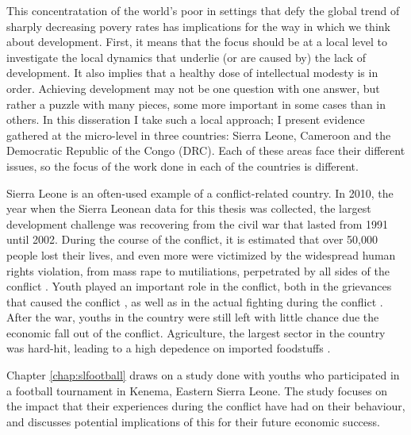 This concentratation of the world's poor in settings that defy the global trend of sharply decreasing povery rates has implications for the way in which we think about development. First, it means that the focus should be at a local level to investigate the local dynamics that underlie (or are caused by) the lack of development. It also implies that a healthy dose of intellectual modesty is in order. Achieving development may not be one question with one answer, but rather a puzzle with many pieces, some more important in some cases than in others. In this disseration I take such a local approach; I  present evidence gathered at the micro-level in three countries: Sierra Leone, Cameroon and the Democratic Republic of the Congo (DRC). Each of these areas face their different issues, so the focus of the work done in each of the countries is different.

Sierra Leone is an often-used example of a conflict-related country. In 2010, the year when the Sierra Leonean data for this thesis was collected, the largest development challenge was recovering from the civil war that lasted from 1991 until 2002. During the course of the conflict, it is estimated that over 50,000 people lost their lives, and even more were victimized by the widespread human rights violation, from mass rape to mutiliations, perpetrated by all sides of the conflict \citep{HumanRightsWatch1999a}. Youth played an important role in the conflict, both in the grievances that caused the conflict \citep[see e.g.][]{Peters1998,Richards2005,Peters2011}, as well as in the actual fighting during the conflict \citep{Humphreys2013}. After the war, youths in the country were still left with little chance due the economic fall out of the conflict.  Agriculture, the largest sector in the country was hard-hit, leading to a high depedence on imported foodstuffs \citep{FAO2005}. 

Chapter \ref{chap:slfootball} draws on a study done with youths who participated in a football tournament in Kenema, Eastern Sierra Leone. The study focuses on the impact that their experiences during the conflict have had on their behaviour, and discusses potential implications of this for their future economic success. 

